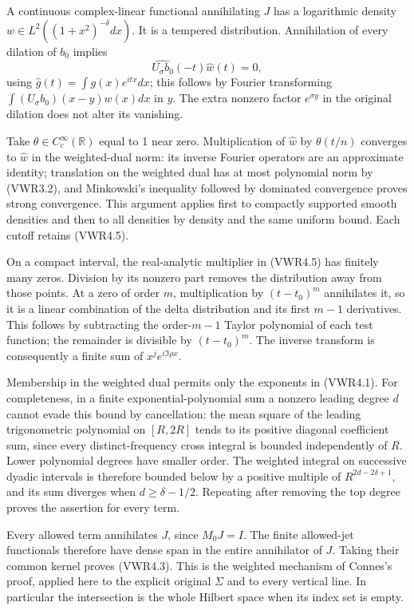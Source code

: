 A continuous complex-linear functional annihilating \(J\) has a
logarithmic density \(w\in L^2((1+x^2)^{-\delta}dx)\). It is a tempered
distribution. Annihilation of every dilation of \(b_0\) implies \[
\widehat{U_\sigma b_0}(-t)\widehat w(t)=0,
\tag{VWR4.5}
\] using \(\widehat g(t)=\int g(x)e^{itx}dx\); this follows by Fourier
transforming \(\int (U_\sigma b_0)(x-y)w(x)dx\) in \(y\). The extra
nonzero factor \(e^{\sigma y}\) in the original dilation does not alter
its vanishing.

Take \(\theta\in C_c^\infty(\mathbb R)\) equal to 1 near zero.
Multiplication of \(\widehat w\) by \(\theta(t/n)\) converges to
\(\widehat w\) in the weighted-dual norm: its inverse Fourier operators
are an approximate identity; translation on the weighted dual has at
most polynomial norm by (VWR3.2), and Minkowski's inequality followed by
dominated convergence proves strong convergence. This argument applies
first to compactly supported smooth densities and then to all densities
by density and the same uniform bound. Each cutoff retains (VWR4.5).

On a compact interval, the real-analytic multiplier in (VWR4.5) has
finitely many zeros. Division by its nonzero part removes the
distribution away from those points. At a zero of order \(m\),
multiplication by \((t-t_0)^m\) annihilates it, so it is a linear
combination of the delta distribution and its first \(m-1\) derivatives.
This follows by subtracting the order-\(m-1\) Taylor polynomial of each
test function; the remainder is divisible by \((t-t_0)^m\). The inverse
transform is consequently a finite sum of \(x^je^{i\Im\rho x}\).

Membership in the weighted dual permits only the exponents in (VWR4.1).
For completeness, in a finite exponential-polynomial sum a nonzero
leading degree \(d\) cannot evade this bound by cancellation: the mean
square of the leading trigonometric polynomial on \([R,2R]\) tends to
its positive diagonal coefficient sum, since every distinct-frequency
cross integral is bounded independently of \(R\). Lower polynomial
degrees have smaller order. The weighted integral on successive dyadic
intervals is therefore bounded below by a positive multiple of
\(R^{2d-2\delta+1}\), and its sum diverges when \(d\ge\delta-1/2\).
Repeating after removing the top degree proves the assertion for every
term.

Every allowed term annihilates \(J\), since \(M_0J=I\). The finite
allowed-jet functionals therefore have dense span in the entire
annihilator of \(J\). Taking their common kernel proves (VWR4.3). This
is the weighted mechanism of Connes's proof, applied here to the
explicit original \(\Sigma\) and to every vertical line. In particular
the intersection is the whole Hilbert space when its index set is empty.

